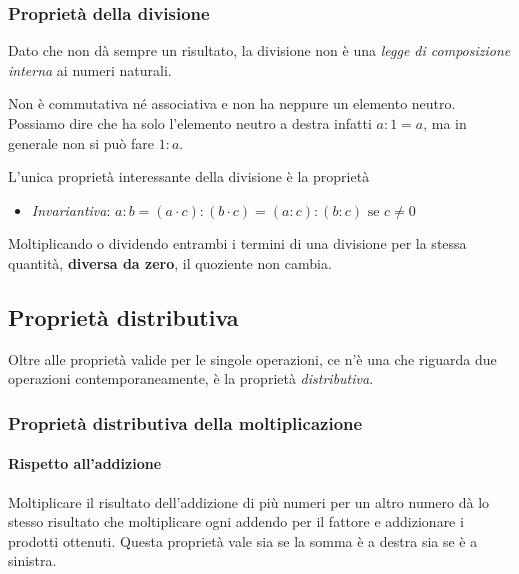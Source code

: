 \subsubsection{Proprietà della divisione}

Dato che non dà sempre un risultato, la divisione non è una 
\emph{legge di composizione interna} ai numeri naturali. 

Non è commutativa né associativa e non ha neppure un elemento neutro.
Possiamo dire che ha solo l'elemento neutro a destra infatti \(a : 1 = a\), 
ma in generale non si può fare \(1 : a\).

L'unica proprietà interessante della divisione è la proprietà
\begin{itemize} [noitemsep]
 \item \emph{Invariantiva}: 
  \(a : b = (a \cdot c) : (b \cdot c) = (a : c) : (b : c) \text{ se } c \neq 
0\)
\end{itemize}

\begin{definizione}{}{}
Moltiplicando o dividendo entrambi i termini di una divisione per 
la stessa quantità, \textbf{diversa da zero}, il quoziente non  cambia.
\end{definizione}

\subsection{Proprietà distributiva}

Oltre alle proprietà valide per le singole operazioni, ce n'è una che 
riguarda due operazioni contemporaneamente, è la proprietà 
\emph{distributiva}.

\subsubsection{Proprietà distributiva della moltiplicazione}

\paragraph{Rispetto all'addizione}
Moltiplicare il risultato dell'addizione di più numeri per un altro numero 
dà lo stesso risultato che moltiplicare ogni addendo per il fattore e 
addizionare i prodotti ottenuti. Questa proprietà vale sia se la somma è a 
destra sia se è a sinistra.


